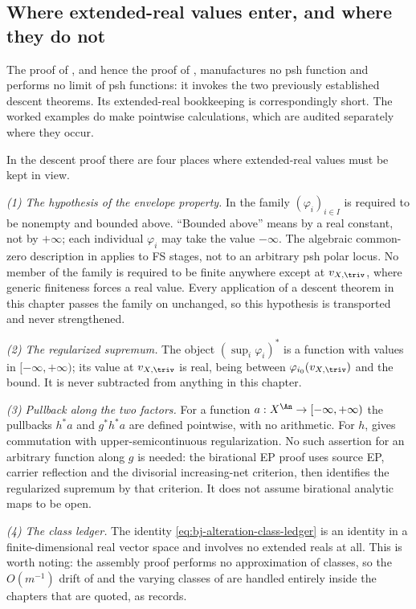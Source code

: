 \subsection{Where extended-real values enter, and where they do not}
\label{sec:ch42-extended-real}

The proof of , and hence the proof of
, manufactures no psh function and performs no
limit of psh functions: it invokes the two previously established descent
theorems.  Its extended-real bookkeeping is correspondingly short.  The
worked examples do make pointwise calculations, which are audited
separately where they occur.

In the descent proof there are four places where extended-real values must
be kept in view.

\emph{(1) The hypothesis of the envelope property.}  In
 the family $(\varphi_i)_{i\in I}$ is
required to be nonempty and bounded above.  ``Bounded above'' means by a
real constant, not by $+\infty$; each individual $\varphi_i$ may take the
value $-\infty$.  The algebraic common-zero description in
 applies to FS stages, not to
an arbitrary psh polar locus.  No member of the family is required
to be finite anywhere except at $v_{X,\triv}$, where generic finiteness
forces a real value.  Every application of a descent theorem in this chapter
passes the family on unchanged, so this hypothesis is transported and never
strengthened.

\emph{(2) The regularized supremum.}  The object $(\sup_i\varphi_i)^*$ is
a function with values in $[-\infty,+\infty)$; its value at
$v_{X,\triv}$ is real, being between $\varphi_{i_0}(v_{X,\triv})$ and the
bound.  It is never subtracted from anything in this chapter.

\emph{(3) Pullback along the two factors.}  For a function
$a:X^{\An}\to[-\infty,+\infty)$ the pullbacks $h^*a$ and $g^*h^*a$ are
defined pointwise, with no arithmetic.
For $h$,  gives commutation with
upper-semicontinuous regularization.
No such assertion for an arbitrary function along $g$ is needed:
the birational EP proof uses source EP, carrier reflection and the
divisorial increasing-net criterion, then identifies the regularized
supremum by that criterion.  It does not assume birational analytic
maps to be open.

\emph{(4) The class ledger.}  The identity
\eqref{eq:bj-alteration-class-ledger} is an identity in a finite-dimensional
real vector space and involves no extended reals at all.  This is worth
noting: the assembly proof performs no approximation of classes, so the
$O(m^{-1})$ drift of  and the varying
classes of  are handled entirely inside the chapters that
are quoted, as  records.

